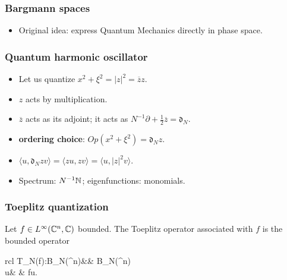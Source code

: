 \documentclass[mathserif]{beamer}
\begin{document}
\begin{frame}
  \frametitle{Bargmann spaces}
  \begin{itemize}
  \item Original idea: express Quantum Mechanics directly in phase
    space.
  \end{itemize}

\end{frame}

\begin{frame}
  \frametitle{Quantum harmonic oscillator}
  \begin{itemize}
  \item Let us quantize $x^2+\xi^2=|z|^2=\overline{z}z$.
  \item<2-> $z$ acts by multiplication.
  \item<3-> $\overline{z}$ acts as its adjoint; it acts as
    $N^{-1}\partial+\frac 12 \overline{z}=\mathfrak{d}_N$.
  \item<4-> {\bf ordering choice}: $Op(x^2+\xi^2)=\mathfrak{d}_Nz$.
  \item<5-> $\langle u,\mathfrak{d}_Nzv\rangle=\langle
    zu,zv\rangle=\langle u,|z|^2v\rangle$.
  \item<6> Spectrum: $N^{-1}\mathbb{N}$; eigenfunctions: monomials. \vspace{1em}
  \end{itemize}
\end{frame}

\begin{frame}
  \frametitle{Toeplitz quantization}
  Let $f\in L^{\infty}(\mathbb{C}^n,\mathbb{C})$ bounded. The Toeplitz operator associated
  with $f$ is the bounded operator
\begin{center}
\begin{array}{rcl}
 		T_N(f):B_N(\C^n)&\to & B_N(\C^n)\\
		u& \mapsto& fu\uncover<2->{)}.
 		\end{array}
\end{center}

\vfill

\end{frame}
\end{document}
